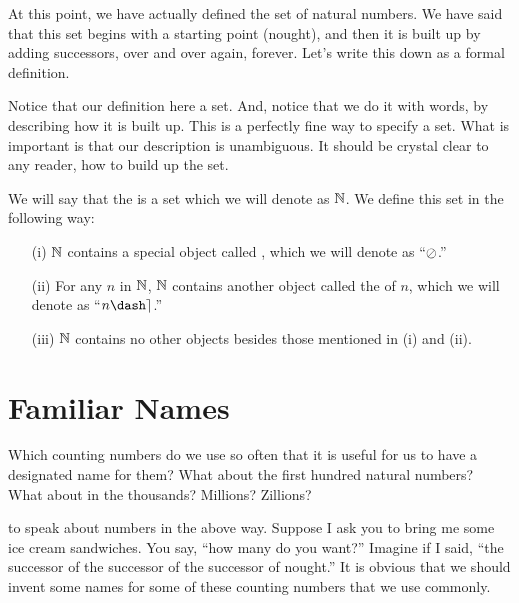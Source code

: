 \documentclass[../../../main.tex]{subfiles}
\begin{document}
At this point, we have actually defined the set of natural numbers. We have said that this set begins with a starting point (nought), and then it is built up by adding successors, over and over again, forever. Let's write this down as a formal definition.

\begin{aside}
  \begin{remark}
    Notice that our definition here  a set. And, notice that we do it with words, by describing how it is built up. This is a perfectly fine way to specify a set. What is important is that our description is unambiguous. It should be crystal clear to any reader, how to build up the set.
  \end{remark}
\end{aside}

\begin{fdefinition}
  \label{def:nats}
  We will say that the  is a set which we will denote as $\Nats/$. We define this set in the following way: 
  
  \begin{itemize} 
  
    \item[(i)] $\Nats/$ contains a special object called , which we will denote as ``$\nought/$.'' 
    \item[(ii)] For any $n$ in $\Nats/$, $\Nats/$ contains another object called the  of $n$, which we will denote as ``$n\dash\tally/$.''
    \item[(iii)] $\Nats/$ contains no other objects besides those mentioned in (i) and (ii).
    
  \end{itemize}
\end{fdefinition}


\section{Familiar Names}

\begin{ponder}
  Which counting numbers do we use so often that it is useful for us to have a designated name for them? What about the first hundred natural numbers? What about in the thousands? Millions? Zillions?
\end{ponder}

 to speak about numbers in the above way. Suppose I ask you to bring me some ice cream sandwiches. You say, ``how many do you want?'' Imagine if I said, ``the successor of the successor of the successor of nought.'' It is obvious that we should invent some names for some of these counting numbers that we use commonly. 
\end{document}
